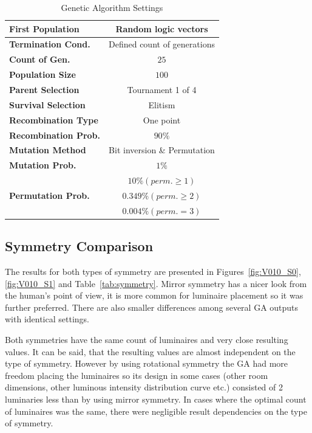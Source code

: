 \begin{table}[htb]
	\renewcommand{\arraystretch}{1.3}
	\caption{Genetic Algorithm Settings}
 	\label{tab:GAsettings}
	\centering
  \begin{tabular}{| l | c |}
    \hline
    \textbf{First Population} & Random logic vectors \\
    \hline
    \textbf{Termination Cond.} & Defined count of generations \\
    \hline
		\textbf{Count of Gen.} & $25$ \\
    \hline
		\textbf{Population Size} & $100$ \\
	\hline
		\textbf{Parent Selection} & Tournament 1 of 4 \\
    \hline
		\textbf{Survival Selection} & Elitism \\
	\hline
		\textbf{Recombination Type} & One point \\
    \hline
		\textbf{Recombination Prob.} & $90 \%$ \\
	\hline
		\textbf{Mutation Method} & Bit inversion \& Permutation\\
	\hline
		\textbf{Mutation Prob.} & $1 \%$ \\
	\hline
		& $10 \% \left( perm. \geq 1\right)$\\
		\textbf{Permutation Prob.} &  $0.349 \% \left( perm. \geq 2\right)$ \\
		&$0.004 \% \left( perm. = 3\right)$\\
    \hline
  \end{tabular}
\end{table}

\subsection{Symmetry Comparison}

The results for both types of symmetry are presented in Figures~\ref{fig:V010_S0}, \ref{fig:V010_S1} and Table~\ref{tab:symmetry}. Mirror symmetry has a nicer look from the human's point of view, it is more common for luminaire placement so it was further preferred. There are also smaller differences among several GA outputs with identical settings.

Both symmetries have the same count of luminaires and very close resulting values. It can be said, that the resulting values are almost independent on the type of symmetry. However by using rotational symmetry the GA had more freedom placing the luminaires so its design in some cases (other room dimensions, other luminous intensity distribution curve etc.) consisted of 2 luminaries less than by using mirror symmetry. In cases where the optimal count of luminaires was the same, there were negligible result dependencies on the type of symmetry.

